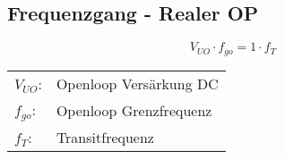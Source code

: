 




\subsection{Frequenzgang - Realer OP}

\[ V_{UO} \cdot f_{go} = 1 \cdot f_T \]

\begin{tabular}{@{}ll}

  $V_{UO}$:	    & Openloop Versärkung DC \\
  $f_{go}$:     & Openloop Grenzfrequenz \\   
  $f_T$:        & Transitfrequenz \\
                
\end{tabular}
